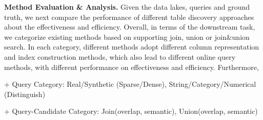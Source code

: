 \noindent\textbf{Method Evaluation \& Analysis.} 
Given the data lakes, queries and ground truth, we next compare the performance of different table discovery approaches about the effectiveness and efficiency. Overall, in terms of the downstream task, we categorize existing methods based on supporting join, union or join\&union search. In each category, different methods adopt different column representation and index construction methods, which also lead to different online query methods, with different performance on effectiveness and efficiency. Furthermore, 

+ Query Category: Real/Synthetic (Sparse/Dense), String/Category/Numerical (Distinguish)

+ Query-Candidate Category: Join(overlap, semantic), Union(overlap, semantic)

